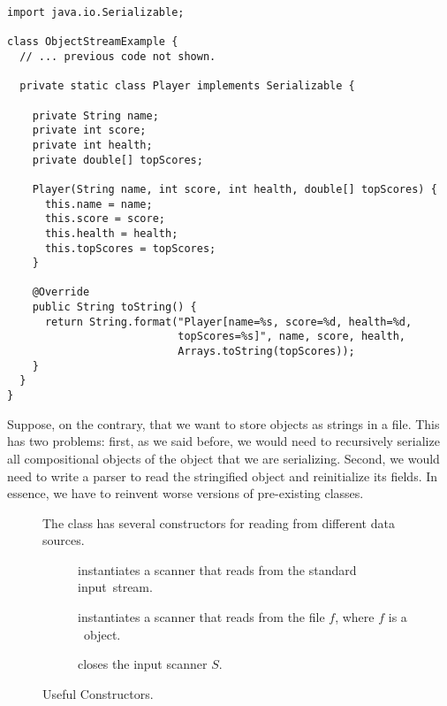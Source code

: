 \enlargethispage{-4\baselineskip}
\begin{lstlisting}[language=MyJava]
import java.io.Serializable;

class ObjectStreamExample {
  // ... previous code not shown.

  private static class Player implements Serializable {

    private String name;
    private int score;
    private int health;
    private double[] topScores;
    
    Player(String name, int score, int health, double[] topScores) {
      this.name = name;
      this.score = score;
      this.health = health;
      this.topScores = topScores;
    }
    
    @Override
    public String toString() {
      return String.format("Player[name=%s, score=%d, health=%d, 
                           topScores=%s]", name, score, health, 
                           Arrays.toString(topScores));
    }
  }
}
\end{lstlisting}

Suppose, on the contrary, that we want to store objects as strings in a file. 
This has two problems: first, as we said before, we would need to recursively serialize all compositional objects of the object that we are serializing. 
Second, we would need to write a parser to read the stringified object and reinitialize its fields. 
In essence, we have to reinvent worse versions of pre-existing classes.

\begin{figure}[tp]
  \small
  \begin{tcolorbox}[title=Scanner Constructor Methods]
    The  class has several constructors for reading from different data sources.
    \vspace{2ex}
  \begin{description}
    \item [] instantiates a scanner that reads from the standard input~stream.
    \item [] instantiates a scanner that reads from the file $f$, where $f$ is a ~object.
    \item [] closes the input scanner $S$.
  \end{description}
\end{tcolorbox}
\caption{Useful  Constructors.}
\label{fig:sccons}
\end{figure}

